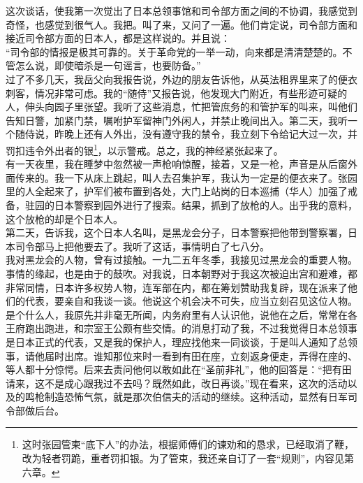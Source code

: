 这次谈话，使我第一次觉出了日本总领事馆和司令部方面之间的不协调，我感觉到奇怪，也感觉到很气人。我把。叫了来，又问了一遍。他们肯定说，司令部方面和接近司令部方面的日本人，都是这样说的。并且说：\\

“司令部的情报是极其可靠的。关于革命党的一举一动，向来都是清清楚楚的。不管怎么说，即使暗杀是一句谣言，也要防备。”\\

过了不多几天，我岳父向我报告说，外边的朋友告诉他，从英法租界里来了的便衣刺客，情况非常可虑。我的“随侍”又报告说，他发现大门附近，有些形迹可疑的人，伸头向园子里张望。我听了这些消息，忙把管庶务的和管护军的叫来，叫他们告知日警，加紧门禁，嘱咐护军留神门外闲人，并禁止晚间出入。第二天，我听一个随侍说，昨晚上还有人外出，没有遵守我的禁令，我立刻下令给记大过一次，并罚扣违令外出者的银\footnote{这时张园管柬“底下人”的办法，根据师傅们的谏劝和的恳求，已经取消了鞭，改为轻者罚跪，重者罚扣银。为了管束，我还亲自订了一套“规则”，内容见第六章。}，以示警戒。总之，我的神经紧张起来了。\\

有一天夜里，我在睡梦中忽然被一声枪响惊醒，接着，又是一枪，声音是从后窗外面传来的。我一下从床上跳起，叫人去召集护军，我认为一定是的便衣来了。张园里的人全起来了，护军们被布置到各处，大门上站岗的日本巡捕（华人）加强了戒备，驻园的日本警察到园外进行了搜索。结果，抓到了放枪的人。出乎我的意料，这个放枪的却是个日本人。\\

第二天，告诉我，这个日本人名叫，是黑龙会分子，日本警察把他带到警察署，日本司令部马上把他要去了。我听了这话，事情明白了七八分。\\

我对黑龙会的人物，曾有过接触。一九二五年冬季，我接见过黑龙会的重要人物。事情的缘起，也是由于的鼓吹。对我说，日本朝野对于我这次被迫出宫和避难，都非常同情，日本许多权势人物，连军部在内，都在筹划赞助我复辟，现在派来了他们的代表，要亲自和我谈一谈。他说这个机会决不可失，应当立刻召见这位人物。是个什么人，我原先并非毫无所闻，内务府里有人认识他，说他在之后，常常在各王府跑出跑进，和宗室王公颇有些交情。的消息打动了我，不过我觉得日本总领事是日本正式的代表，又是我的保护人，理应找他来一同谈谈，于是叫人通知了总领事，请他届时出席。谁知那位来时一看到有田在座，立刻返身便走，弄得在座的、等人都十分惊愕。后来去责问他何以敢如此在“圣前非礼”，他的回答是：“把有田请来，这不是成心跟我过不去吗？既然如此，改日再谈。”现在看来，这次的活动以及的鸣枪制造恐怖气氛，就是那次伯信夫的活动的继续。这种活动，显然有日军司令部做后台。\\

